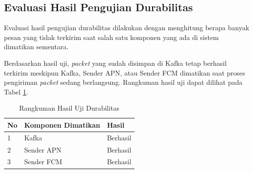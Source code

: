 \subsection{Evaluasi Hasil Pengujian Durabilitas}
\par Evaluasi hasil pengujian durabilitas dilakukan dengan menghitung berapa banyak pesan yang tidak terkirim saat salah satu komponen yang ada di sistem dimatikan sementara.
\par Berdasarkan hasil uji, \textit{packet} yang sudah disimpan di Kafka tetap berhasil terkirim meskipun Kafka, Sender APN, atau Sender FCM dimatikan saat proses pengiriman \textit{packet} sedang berlangsung. Rangkuman hasil uji dapat dilihat pada Tabel \ref{t:rangkuman-durabilitas}.
\begin{longtable}{|p{0.5cm}|p{3.5cm}|p{2cm}|}
	\caption{Rangkuman Hasil Uji Durabilitas} \label{t:rangkuman-durabilitas} \\ \hline
	\rowcolor{lightgray} No & Komponen Dimatikan & Hasil \\ \hline 
	\endhead
	1 & Kafka & Berhasil \\ \hline
	2 & Sender APN & Berhasil \\ \hline
	3 & Sender FCM & Berhasil \\ \hline
\end{longtable}
